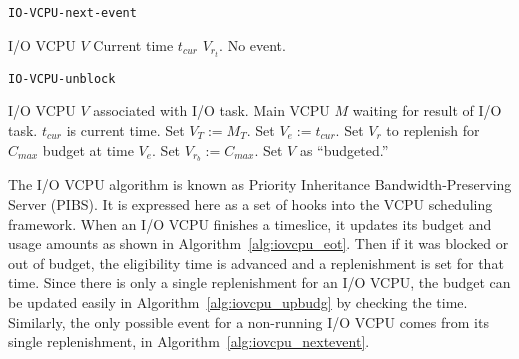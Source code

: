 \documentclass[twocolumn,10pt]{article}
\begin{document}
\begin{algorithm}
  \caption{\tt IO-VCPU-next-event}\label{alg:iovcpu_nextevent}
  \begin{algorithmic}[1]
    \REQUIRE I/O VCPU $V$
    \REQUIRE Current time $t_{cur}$
    \RETURN $V_{r_t}$.
    \ELSE
    \RETURN No event.
    \ENDIF
  \end{algorithmic}
\end{algorithm}

\begin{algorithm*}
  \caption{\tt IO-VCPU-unblock}\label{alg:iovcpu_unblock}
  \begin{algorithmic}[1]
    \REQUIRE I/O VCPU $V$ associated with I/O task.
    \REQUIRE Main VCPU $M$ waiting for result of I/O task.
    \REQUIRE $t_{cur}$ is current time.
    \STATE Set $V_T:=M_T$.
    \ENDIF
    \STATE Set $V_e:=t_{cur}$.
    \ENDIF
    \STATE Set $V_r$ to replenish for $C_{max}$ budget at time $V_e$.
    \ENDIF
    \ELSE
    \STATE Set $V_{r_b}:=C_{max}$.
    \ENDIF
    \STATE Set $V$ as ``budgeted.''
  \end{algorithmic}
\end{algorithm*}

The I/O VCPU algorithm is known as Priority Inheritance
Bandwidth-Preserving Server (PIBS).  It is expressed here as a set of
hooks into the VCPU scheduling framework.  When an I/O VCPU finishes a
timeslice, it updates its budget and usage amounts as shown in
Algorithm~\ref{alg:iovcpu_eot}.  Then if it was blocked or out of
budget, the eligibility time is advanced and a replenishment is set
for that time.  Since there is only a single replenishment for an I/O
VCPU, the budget can be updated easily in
Algorithm~\ref{alg:iovcpu_upbudg} by checking the time.  Similarly,
the only possible event for a non-running I/O VCPU comes from its
single replenishment, in Algorithm~\ref{alg:iovcpu_nextevent}.
\end{document}
